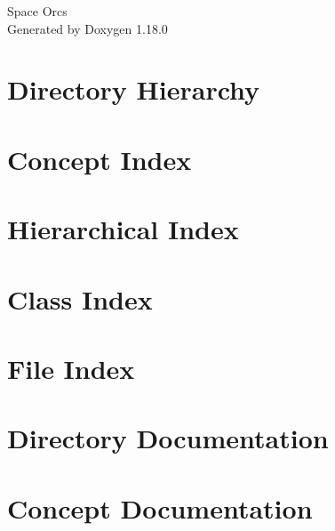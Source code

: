 \documentclass[twoside]{book}
\newcommand{\+}{\discretionary{\mbox{\scriptsize$\hookleftarrow$}}{}{}}
\newcommand{\clearemptydoublepage}{%
    \newpage{\pagestyle{empty}\cleardoublepage}%
  }
\begin{document}
  \raggedbottom
    \hypersetup{pageanchor=false,
                bookmarksnumbered=true,
                pdfencoding=unicode
               }
  \begin{titlepage}
  \vspace*{7cm}
  \begin{center}%
  {\Large Space Orcs}\\
  \vspace*{1cm}
  {\large Generated by Doxygen 1.18.0}\\
  \end{center}
  \end{titlepage}
  \clearemptydoublepage
  \tableofcontents
  \clearemptydoublepage
  \hypersetup{pageanchor=true}

\chapter{Directory Hierarchy}

\chapter{Concept Index}

\chapter{Hierarchical Index}

\chapter{Class Index}

\chapter{File Index}

\chapter{Directory Documentation}







\chapter{Concept Documentation}

\end{document}
